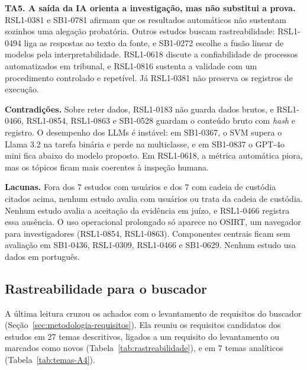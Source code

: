 \textbf{TA5. A saída da IA orienta a investigação, mas não substitui a
prova.} RSL1-0381 e SB1-0781 afirmam que os resultados automáticos não
sustentam sozinhos uma alegação probatória. Outros estudos buscam
rastreabilidade: RSL1-0494 liga as respostas ao texto da fonte, e SB1-0272
escolhe a fusão linear de modelos pela interpretabilidade. RSL1-0618
discute a confiabilidade de processos automatizados em tribunal, e RSL1-0816
sustenta a validade com um procedimento controlado e repetível. Já
RSL1-0381 não preserva os registros de execução.

\textbf{Contradições.} Sobre reter dados, RSL1-0183 não guarda dados brutos,
e RSL1-0466, RSL1-0854, RSL1-0863 e SB1-0528 guardam o conteúdo bruto com
\textit{hash} e registro. O desempenho dos LLMs é instável: em SB1-0367, o
SVM supera o Llama 3.2 na tarefa binária e perde na multiclasse, e em
SB1-0837 o GPT-4o mini fica abaixo do modelo proposto. Em RSL1-0618, a
métrica automática piora, mas os tópicos ficam mais coerentes à inspeção
humana.

\textbf{Lacunas.} Fora dos 7 estudos com usuários e dos 7 com cadeia de
custódia citados acima, nenhum estudo avalia com usuários ou trata da cadeia
de custódia. Nenhum estudo avalia a aceitação da evidência em juízo, e
RSL1-0466 registra essa ausência. O uso operacional prolongado só aparece no
OSIRT, um navegador para investigadores (RSL1-0854, RSL1-0863).
Componentes centrais ficam sem avaliação em SB1-0436, RSL1-0309, RSL1-0466 e
SB1-0629. Nenhum estudo usa dados em português.

\subsection{Rastreabilidade para o buscador}
\label{sec:rsl1-rastreabilidade}

A última leitura cruzou os achados com o levantamento de requisitos do
buscador (Seção~\ref{sec:metodologia-requisitos}). Ela reuniu os requisitos
candidatos dos estudos em 27 temas descritivos, ligados a um requisito do
levantamento ou marcados como novos (Tabela~\ref{tab:rastreabilidade}), e em
7 temas analíticos (Tabela~\ref{tab:temas-A4}).






